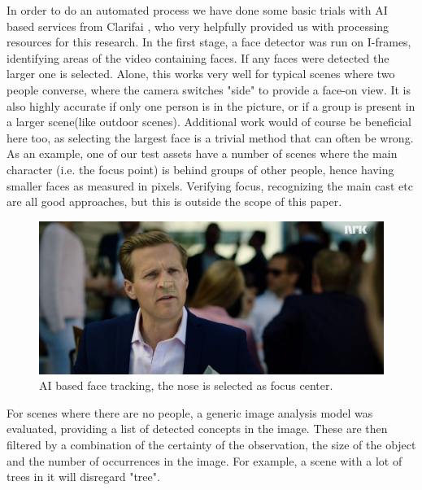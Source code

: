 \documentclass[sigconf, review=true]{acmart}
\begin{document}
In order to do an automated process we have done some basic trials with AI
based services from Clarifai \cite{clarifai}, who very helpfully provided us
with processing resources for this research. In the first stage, a face
detector was run on I-frames, identifying areas of the video containing
faces. If any faces were detected the larger one is selected. Alone, this
works very well for typical scenes where two people converse, where the
camera switches "side" to provide a face-on view. It is also highly accurate
if only one person is in the picture, or if a group is present in a larger
scene(like outdoor scenes). Additional work would of course be beneficial
here too, as selecting the largest face is a trivial method that can often be
wrong. As an example, one of our test assets have a number of scenes where
the main character (i.e. the focus point) is behind groups of other people,
hence having smaller faces as measured in pixels. Verifying focus,
recognizing the main cast etc are all good approaches, but this is outside
the scope of this paper.

\begin{figure}
\begin{center}
\includegraphics[width=1.0\columnwidth]{track_face.png}
\caption{AI based face tracking, the nose is selected as focus center.}
\label{fig_face_tracking}
\end{center}
\end{figure}

For scenes where there are no people, a generic image analysis model was
evaluated, providing a list of detected concepts in the image. These are then
filtered by a combination of the certainty of the observation, the size of
the object and the number of occurrences in the image. For example, a scene
with a lot of trees in it will disregard "tree".
\end{document}
